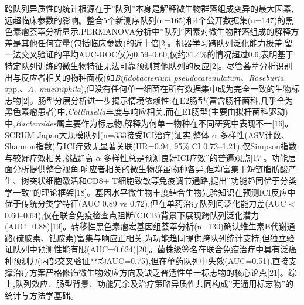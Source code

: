 \documentclass[11pt]{article}
\begin{document}
跨队列异质性的统计根源在于''队列''本身是解释微生物群落组成变异的最大因素,远超临床参数的影响。整合5个新测序队列(n=165)和4个公开数据集(n=147)的黑色素瘤荟萃分析显示,PERMANOVA分析中''队列''因素对微生物群落组成的解释方差是其他任何变量(包括临床参数)的近十倍{[}2{]}。机器学习跨队列泛化能力极差:留一法交叉验证的平均AUC-ROC仅为0.59--0.60,仅约31.4\%的情况超过0.6,表明基于特定队列训练的微生物特征无法可靠预测其他队列的反应{[}2{]}。尽管荟萃分析识别出与反应者相关的物种面板(如\emph{Bifidobacterium pseudocatenulatum}、\emph{Roseburia} spp.、\emph{A. muciniphila}),但没有任何单一细菌在所有数据集中成为完全一致的生物标志物{[}2{]}。肠型分层分析进一步揭示情境依赖性:在E2肠型(富含肠杆菌科,几乎全为黑色素瘤患者)中,\emph{Collinsella}丰度与响应相关,而在E1肠型(主要由拟杆菌科驱动)中,\emph{Bacteroides}属主要作为标志物,解释为何单一物种在不同研究中表现不一{[}16{]}。SCRUM-Japan大规模队列(n=333接受ICI治疗)证实,整体 \(\alpha\) 多样性(ASV计数、Shannon指数)与ICI疗效无显著关联(HR=0.94, 95\% CI 0.73--1.21),仅Simpson指数与较好疗效相关,挑战''高 \(\alpha\) 多样性总是预测良好ICI疗效''的普遍观点{[}17{]}。功能层面分析提供整合视角:响应者相关的微生物群虽物种各异,但均富集于短链脂肪酸产生、树突状细胞激活和CD8+ T细胞致敏等免疫调节通路,提出''功能趋同优于分类学一致''的理论框架{[}18{]}。基因水平微生物丰度结合生物先验知识在预测ICI反应中优于传统分类学特征(AUC 0.89 vs 0.72),但在单药治疗队列间泛化能力差(AUC \textless{} 0.60--0.64),仅在联合免疫检查点阻断(CICB)背景下展现跨队列泛化潜力(AUC=0.88){[}19{]}。转移性黑色素瘤宏基因组荟萃分析(n=130)确认维生素B代谢通路(硫胺素、钴胺素)富集与响应正相关,为功能趋同提供跨队列统计支持,但独立验证队列中预测性能有限(AUC=0.624){[}20{]}。菌株级签名在联合免疫治疗中具有泛癌种预测力(内部交叉验证平均AUC=0.75),但在单药队列中失效(AUC=0.51),直接支撑治疗方案严格修饰微生物效应方向及缺乏普适性单一标志物的核心论点{[}21{]}。综上,队列效应、肠型背景、功能冗余及治疗策略异质性共同构成''无通用标志物''的统计与方法学基础。
\end{document}
